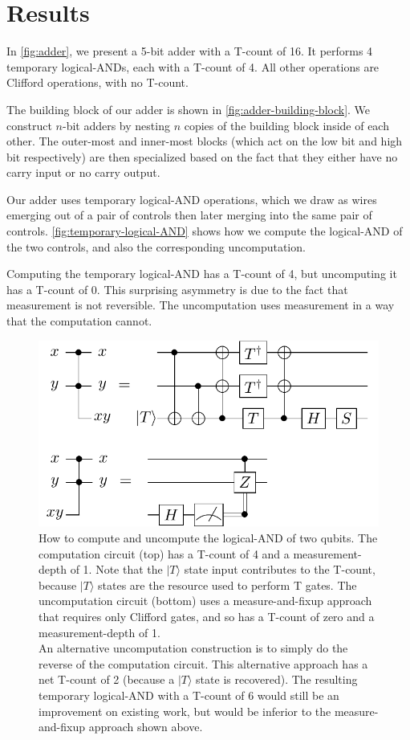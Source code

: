 \documentclass[twocolumn]{quantumarticle-customized}
\begin{document}
\section*{Results}

In \autoref{fig:adder}, we present a 5-bit adder with a T-count of 16.
It performs 4 temporary logical-ANDs, each with a T-count of 4.
All other operations are Clifford operations, with no T-count.

The building block of our adder is shown in \autoref{fig:adder-building-block}.
We construct $n$-bit adders by nesting $n$ copies of the building block inside of each other.
The outer-most and inner-most blocks (which act on the low bit and high bit respectively) are then specialized based on the fact that they either have no carry input or no carry output.

Our adder uses temporary logical-AND operations, which we draw as wires emerging out of a pair of controls then later merging into the same pair of controls.
\autoref{fig:temporary-logical-AND} shows how we compute the logical-AND of the two controls, and also the corresponding uncomputation.

Computing the temporary logical-AND has a T-count of 4, but uncomputing it has a T-count of 0.
This surprising asymmetry is due to the fact that measurement is not reversible.
The uncomputation uses measurement in a way that the computation cannot.

\begin{figure}
  \includegraphics[width=\linewidth]{temporary-logical-and.pdf}
  \caption{
	How to compute and uncompute the logical-AND of two qubits.
	The computation circuit (top) has a T-count of 4 and a measurement-depth of 1.
	Note that the $|T\rangle$ state input contributes to the T-count, because $|T\rangle$ states are the resource used to perform T gates.
	The uncomputation circuit (bottom) uses a measure-and-fixup approach \cite{Jones2013} that requires only Clifford gates, and so has a T-count of zero and a measurement-depth of 1.
    \\
    An alternative uncomputation construction is to simply do the reverse of the computation circuit.
    This alternative approach has a net T-count of 2 (because a $|T\rangle$ state is recovered).
    The resulting temporary logical-AND with a T-count of 6 would still be an improvement on existing work, but would be inferior to the measure-and-fixup approach shown above.
  }
  \label{fig:temporary-logical-AND}
\end{figure}
\end{document}
